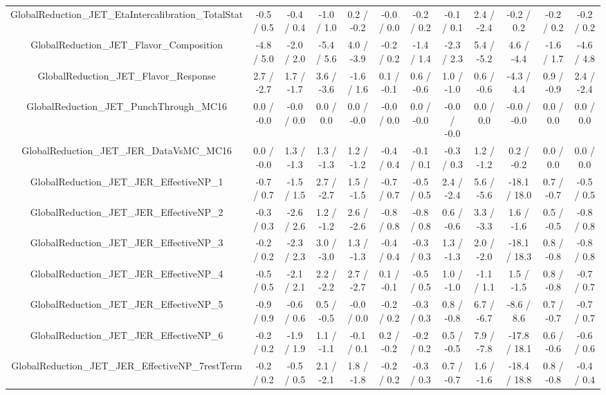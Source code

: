 \begin{table}[htbp]
\begin{center}
\begin{tabular}{|c|c|c|c|c|c|c|c|c|c|c|c|}
  GlobalReduction_JET_EtaIntercalibration_TotalStat & -0.5 / 0.5 & -0.4 / 0.4 & -1.0 / 1.0 & 0.2 / -0.2 & -0.0 / 0.0 & -0.2 / 0.2 & -0.1 / 0.1 & 2.4 / -2.4 & -0.2 / 0.2 & -0.2 / 0.2 & -0.2 / 0.2 \\ 
  GlobalReduction_JET_Flavor_Composition & -4.8 / 5.0 & -2.0 / 2.0 & -5.4 / 5.6 & 4.0 / -3.9 & -0.2 / 0.2 & -1.4 / 1.4 & -2.3 / 2.3 & 5.4 / -5.2 & 4.6 / -4.4 & -1.6 / 1.7 & -4.6 / 4.8 \\ 
  GlobalReduction_JET_Flavor_Response & 2.7 / -2.7 & 1.7 / -1.7 & 3.6 / -3.6 & -1.6 / 1.6 & 0.1 / -0.1 & 0.6 / -0.6 & 1.0 / -1.0 & 0.6 / -0.6 & -4.3 / 4.4 & 0.9 / -0.9 & 2.4 / -2.4 \\ 
  GlobalReduction_JET_PunchThrough_MC16 & 0.0 / -0.0 & -0.0 / 0.0 & 0.0 / 0.0 & 0.0 / -0.0 & -0.0 / 0.0 & 0.0 / -0.0 & -0.0 / -0.0 & 0.0 / 0.0 & -0.0 / -0.0 & 0.0 / 0.0 & 0.0 / 0.0 \\ 
  GlobalReduction_JET_JER_DataVsMC_MC16 & 0.0 / -0.0 & 1.3 / -1.3 & 1.3 / -1.3 & 1.2 / -1.2 & -0.4 / 0.4 & -0.1 / 0.1 & -0.3 / 0.3 & 1.2 / -1.2 & 0.2 / -0.2 & 0.0 / 0.0 & 0.0 / 0.0 \\ 
  GlobalReduction_JET_JER_EffectiveNP_1 & -0.7 / 0.7 & -1.5 / 1.5 & 2.7 / -2.7 & 1.5 / -1.5 & -0.7 / 0.7 & -0.5 / 0.5 & 2.4 / -2.4 & 5.6 / -5.6 & -18.1 / 18.0 & 0.7 / -0.7 & -0.5 / 0.5 \\ 
  GlobalReduction_JET_JER_EffectiveNP_2 & -0.3 / 0.3 & -2.6 / 2.6 & 1.2 / -1.2 & 2.6 / -2.6 & -0.8 / 0.8 & -0.8 / 0.8 & 0.6 / -0.6 & 3.3 / -3.3 & 1.6 / -1.6 & 0.5 / -0.5 & -0.8 / 0.8 \\ 
  GlobalReduction_JET_JER_EffectiveNP_3 & -0.2 / 0.2 & -2.3 / 2.3 & 3.0 / -3.0 & 1.3 / -1.3 & -0.4 / 0.4 & -0.3 / 0.3 & 1.3 / -1.3 & 2.0 / -2.0 & -18.1 / 18.3 & 0.8 / -0.8 & -0.8 / 0.8 \\ 
  GlobalReduction_JET_JER_EffectiveNP_4 & -0.5 / 0.5 & -2.1 / 2.1 & 2.2 / -2.2 & 2.7 / -2.7 & 0.1 / -0.1 & -0.5 / 0.5 & 1.0 / -1.0 & -1.1 / 1.1 & 1.5 / -1.5 & 0.8 / -0.8 & -0.7 / 0.7 \\ 
  GlobalReduction_JET_JER_EffectiveNP_5 & -0.9 / 0.9 & -0.6 / 0.6 & 0.5 / -0.5 & -0.0 / 0.0 & -0.2 / 0.2 & -0.3 / 0.3 & 0.8 / -0.8 & 6.7 / -6.7 & -8.6 / 8.6 & 0.7 / -0.7 & -0.7 / 0.7 \\ 
  GlobalReduction_JET_JER_EffectiveNP_6 & -0.2 / 0.2 & -1.9 / 1.9 & 1.1 / -1.1 & -0.1 / 0.1 & 0.2 / -0.2 & -0.2 / 0.2 & 0.5 / -0.5 & 7.9 / -7.8 & -17.8 / 18.1 & 0.6 / -0.6 & -0.6 / 0.6 \\ 
  GlobalReduction_JET_JER_EffectiveNP_7restTerm & -0.2 / 0.2 & -0.5 / 0.5 & 2.1 / -2.1 & 1.8 / -1.8 & -0.2 / 0.2 & -0.3 / 0.3 & 0.7 / -0.7 & 1.6 / -1.6 & -18.4 / 18.8 & 0.8 / -0.8 & -0.4 / 0.4 \\ 

\end{tabular}
\end{center}
\end{table}
